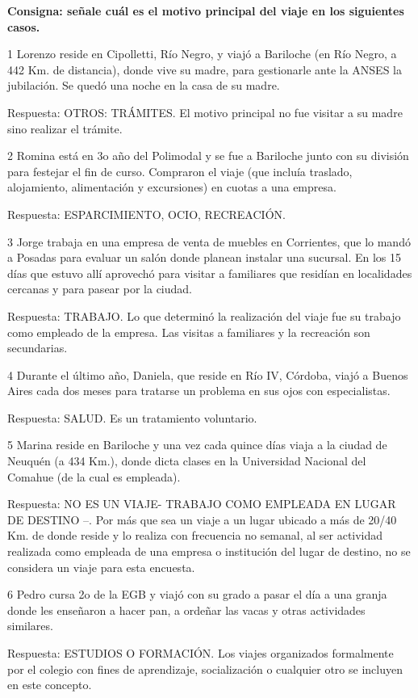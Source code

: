 \documentclass[
  openany]{book}
\begin{document}
\textbf{Consigna: señale cuál es el motivo principal del viaje en los siguientes casos.}

1 Lorenzo reside en Cipolletti, Río Negro, y viajó a Bariloche (en Río Negro, a 442 Km. de distancia), donde vive su madre, para gestionarle ante la ANSES la jubilación. Se quedó una noche en la casa de su madre.

Respuesta: OTROS: TRÁMITES. El motivo principal no fue visitar a su madre sino realizar el trámite.

2 Romina está en 3o año del Polimodal y se fue a Bariloche junto con su división para festejar el fin de curso. Compraron el viaje (que incluía traslado, alojamiento, alimentación y excursiones) en cuotas a una empresa.

Respuesta: ESPARCIMIENTO, OCIO, RECREACIÓN.

3 Jorge trabaja en una empresa de venta de muebles en Corrientes, que lo mandó a Posadas para evaluar un salón donde planean instalar una sucursal. En los 15 días que estuvo allí aprovechó para visitar a familiares que residían en localidades cercanas y para pasear por la ciudad.

Respuesta: TRABAJO. Lo que determinó la realización del viaje fue su trabajo como empleado de la empresa. Las visitas a familiares y la recreación son secundarias.

4 Durante el último año, Daniela, que reside en Río IV, Córdoba, viajó a Buenos Aires cada dos meses para tratarse un problema en sus ojos con especialistas.

Respuesta: SALUD. Es un tratamiento voluntario.

5 Marina reside en Bariloche y una vez cada quince días viaja a la ciudad de Neuquén (a 434 Km.), donde dicta clases en la Universidad Nacional del Comahue (de la cual es empleada).

Respuesta: NO ES UN VIAJE- TRABAJO COMO EMPLEADA EN LUGAR DE DESTINO --. Por más que sea un viaje a un lugar ubicado a más de 20/40 Km. de donde reside y lo realiza con frecuencia no semanal, al ser actividad realizada como empleada de una empresa o institución del lugar de destino, no se considera un viaje para esta encuesta.

6 Pedro cursa 2o de la EGB y viajó con su grado a pasar el día a una granja donde les enseñaron a hacer pan, a ordeñar las vacas y otras actividades similares.

Respuesta: ESTUDIOS O FORMACIÓN. Los viajes organizados formalmente por el colegio con fines de aprendizaje, socialización o cualquier otro se incluyen en este concepto.
\end{document}
